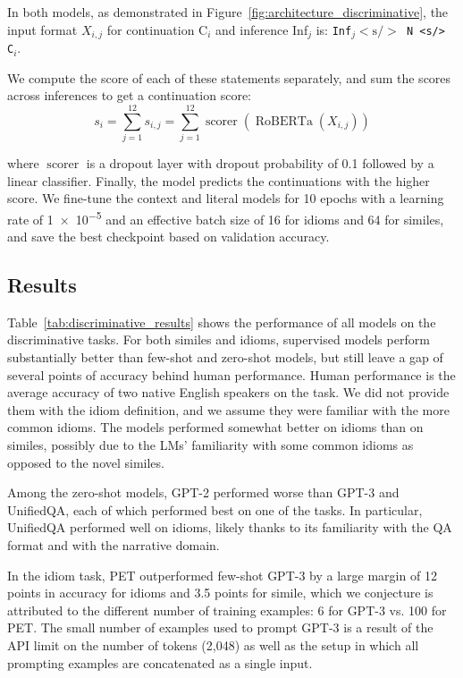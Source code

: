 In both models, as demonstrated in Figure~\ref{fig:architecture_discriminative}, the input format $X_{i,j}$ for continuation C$_i$ and inference Inf$_j$ is: \texttt{Inf$_j \lt\text{s/}\gt$ N <s/> C$_i$}.

We compute the score of each of these statements separately, and sum the scores across inferences to get a continuation score:
\begin{equation*}
s_{i} = \sum_{j=1}^{12} s_{i,j} = \sum_{j=1}^{12} \operatorname{scorer}(\operatorname{RoBERTa}(X_{i,j}))
\end{equation*}

\noindent where $\operatorname{scorer}$ is a dropout layer with dropout probability of 0.1 followed by a linear classifier. Finally, the model predicts the continuations with the higher score. We fine-tune the context and literal models for 10 epochs with a learning rate of \num{1e-5} and an effective batch size of 16 for idioms and 64 for similes, and save the best checkpoint based on validation accuracy. 


\subsection{Results}
\label{sec:disc:results}

Table~\ref{tab:discriminative_results} shows the performance of all models on the discriminative tasks. For both similes and idioms, supervised models perform substantially better than few-shot and zero-shot models, but still leave a gap of several points of accuracy behind human performance. Human performance is the average accuracy of two native English speakers on the task. We did not provide them with the idiom definition, and we assume they were familiar with the more common idioms. The models performed somewhat better on idioms than on similes, possibly due to the LMs' familiarity with some common idioms as opposed to the novel similes.

Among the zero-shot models, GPT-2 performed worse than GPT-3 and UnifiedQA, each of which performed best on one of the tasks. In particular, UnifiedQA performed well on idioms, likely thanks to its familiarity with the QA format and with the narrative domain.  

In the idiom task, PET outperformed few-shot GPT-3 by a large margin of 12 points in accuracy for idioms and 3.5 points for simile, which we conjecture is attributed to the different number of training examples: 6 for GPT-3 vs. 100 for PET. The small number of examples used to prompt GPT-3 is a result of the API limit on the number of tokens (2,048) as well as the setup in which all prompting examples are concatenated as a single input. 

